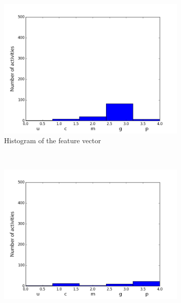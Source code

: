 \documentclass[11pt, oneside]{article}   	%
\begin{document}
\begin{figure}[!htb]
\begin{subfigure}[b]{0.45\textwidth}
                \label{hist2}
        \end{subfigure}
        ~ %
        \begin{subfigure}[b]{0.45\textwidth}
                \includegraphics[width=\textwidth]{./hist3.png}
                \caption{Histogram of the feature vector}
                \label{hist3}
        \end{subfigure}
        ~ %
        \begin{subfigure}[b]{0.45\textwidth}
                \includegraphics[width=\textwidth]{./hist4.png}

\end{subfigure}
\end{figure}
\end{document}
